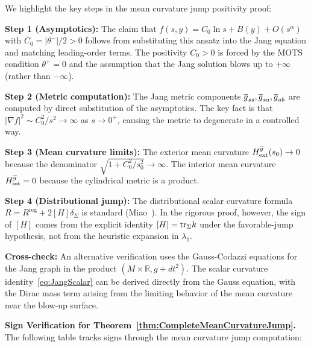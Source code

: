 \begin{remark}\label{rem:JumpVerification}
We highlight the key steps in the mean curvature jump positivity proof:

\textbf{Step 1 (Asymptotics):} The claim that $f(s,y) = C_0 \ln s + B(y) + O(s^\alpha)$ with $C_0 = |\theta^-|/2 > 0$ follows from substituting this ansatz into the Jang equation and matching leading-order terms. The positivity $C_0 > 0$ is forced by the MOTS condition $\theta^+ = 0$ and the assumption that the Jang solution blows up to $+\infty$ (rather than $-\infty$).

\textbf{Step 2 (Metric computation):} The Jang metric components $\overline{g}_{ss}, \overline{g}_{sa}, \overline{g}_{ab}$ are computed by direct substitution of the asymptotics. The key fact is that $|\nabla f|^2 \sim C_0^2/s^2 \to \infty$ as $s \to 0^+$, causing the metric to degenerate in a controlled way.

\textbf{Step 3 (Mean curvature limits):} The exterior mean curvature $H^{\overline{g}}_{\text{ext}}(s_0) \to 0$ because the denominator $\sqrt{1 + C_0^2/s_0^2} \to \infty$. The interior mean curvature $H^{\overline{g}}_{\text{int}} = 0$ because the cylindrical metric is a product.

\textbf{Step 4 (Distributional jump):} The distributional scalar curvature formula $R = R^{\text{reg}} + 2[H]\delta_\Sigma$ is standard (Miao~\cite{miao2002}). In the rigorous proof, however, the sign of $[H]$ comes from the explicit identity $[H]=\mathrm{tr}_\Sigma k$ under the favorable-jump hypothesis, not from the heuristic expansion in $\lambda_1$.

\textbf{Cross-check:} An alternative verification uses the Gauss-Codazzi equations for the Jang graph in the product $(M \times \mathbb{R}, g + dt^2)$. The scalar curvature identity~\eqref{eq:JangScalar} can be derived directly from the Gauss equation, with the Dirac mass term arising from the limiting behavior of the mean curvature near the blow-up surface.
\end{remark}

\textbf{Sign Verification for Theorem~\ref{thm:CompleteMeanCurvatureJump}.}
The following table tracks signs through the mean curvature jump computation:

